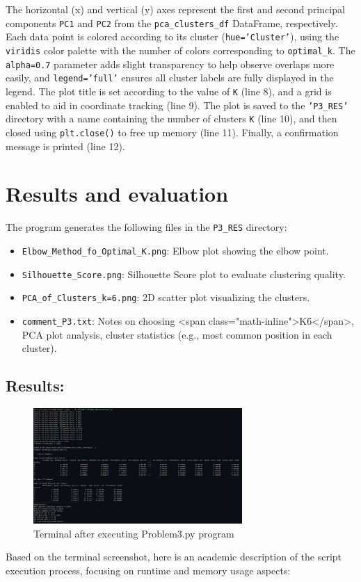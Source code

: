 \documentclass[12pt]{report}
\begin{document}
{{{The horizontal (x) and vertical (y) axes represent the first and second principal components \texttt{PC1} and \texttt{PC2} from the \texttt{pca\_clusters\_df} DataFrame, respectively. Each data point is colored according to its cluster (\texttt{hue='Cluster'}), using the \texttt{viridis} color palette with the number of colors corresponding to \texttt{optimal\_k}. The \texttt{alpha=0.7} parameter adds slight transparency to help observe overlaps more easily, and \texttt{legend='full'} ensures all cluster labels are fully displayed in the legend. The plot title is set according to the value of \texttt{K} (line 8), and a grid is enabled to aid in coordinate tracking (line 9). The plot is saved to the \texttt{'P3\_RES'} directory with a name containing the number of clusters \texttt{K} (line 10), and then closed using \texttt{plt.close()} to free up memory (line 11). Finally, a confirmation message is printed (line 12).
\section{Results and evaluation} %
The program generates the following files in the \texttt{P3\_RES} directory:
\begin{itemize}
  \item \texttt{Elbow\_Method\_fo\_Optimal\_K.png}: Elbow plot showing the elbow point.
  \item \texttt{Silhouette\_Score.png}: Silhouette Score plot to evaluate clustering quality.
  \item \texttt{PCA\_of\_Clusters\_k=6.png}: 2D scatter plot visualizing the clusters.
  \item \texttt{comment\_P3.txt}: Notes on choosing <span class="math-inline">K\=6</span>, PCA plot analysis, cluster statistics (e.g., most common position in each cluster).
\end{itemize}
\subsection{Results:}
\begin{figure}[h]
    \centering
    \includegraphics[width=300px]{Terminal_3.png}
    \caption{Terminal after executing Problem3.py program}
    \label{fig:term3}
\end{figure}
Based on the terminal screenshot, here is an academic description of the script execution process, focusing on runtime and memory usage aspects:

}}}
\end{document}

